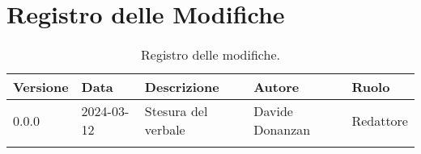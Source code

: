 \section*{Registro delle Modifiche}
\begin{table}[ht!]	
		\centering
		\begin{tabular}{p{1.2cm} p{2cm} p{6cm} p{3cm} p{2cm}}
			\toprule
			\textbf{Versione}& \textbf{Data} & \textbf{Descrizione} & \textbf{Autore} & \textbf{Ruolo} \\
			\midrule
			0.0.0 & 2024-03-12 & Stesura del verbale  & Davide Donanzan &
			Redattore \\\\ %
			\bottomrule
		\end{tabular}
		\caption{Registro delle modifiche.}
		\label{table:Registro delle modifiche.}
\end{table}